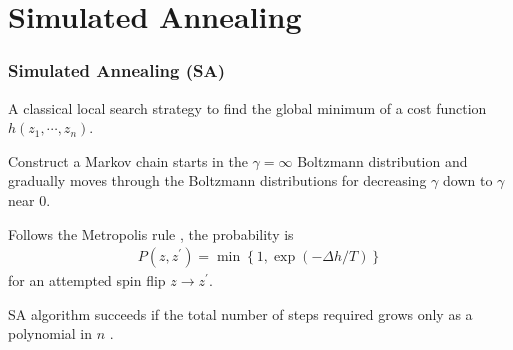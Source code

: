 \documentclass[11pt,compress,mathserif]{beamer}
\begin{document}




\section[SA]{Simulated Annealing}

\begin{frame}\frametitle{Simulated Annealing (SA)}

\bit

\item A classical local search strategy to find the global minimum of a cost function $h(z_1, \cdots, z_n)$.

\item Construct a Markov chain starts in the $\gamma = \infty$ Boltzmann distribution and gradually moves through the Boltzmann distributions for decreasing $\gamma$ down to $\gamma$ near 0.

\item Follows the Metropolis rule \cite{metropolis1953equation}, the probability is
\begin{align}
    \label{eq1}
    P\left(z, z^{\prime}\right)=\min \left\{1, \exp \left(-\Delta h / T\right)\right\}  
\end{align}
for an attempted spin flip $z \rightarrow z^{\prime}$.

\item SA algorithm succeeds if the total number of steps required grows only as a polynomial in $n$ \cite{farhi2002quantum}.

\eit



\end{frame}
\end{document}
